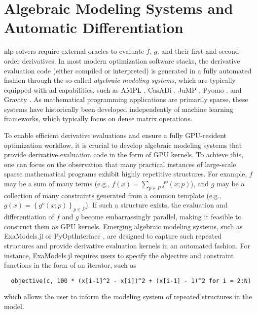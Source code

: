 \documentclass{article}
\begin{document}
\section{Algebraic Modeling Systems and Automatic Differentiation}\label{eqn:ad}
\Gls*{nlp} solvers require external oracles to evaluate $f$, $g$, and their first and second-order derivatives. In most modern optimization software stacks, the derivative evaluation code (either compiled or interpreted) is generated in a fully automated fashion through the so-called \emph{algebraic modeling systems}, which are typically equipped with \gls*{ad} capabilities, such as AMPL \cite{fourerModelingLanguageMathematical1990}, CasADi \cite{anderssonCasADiSoftwareFramework2019}, JuMP \cite{dunningJuMPModelingLanguage2017}, Pyomo \cite{hartPyomoModelingSolving2011}, and Gravity \cite{hijaziGravityMathematicalModeling2018}. As mathematical programming applications are primarily sparse, these systems have historically been developed independently of machine learning frameworks, which typically focus on dense matrix operations.

To enable efficient derivative evaluations and ensure a fully GPU-resident optimization workflow, it is crucial to develop algebraic modeling systems that provide derivative evaluation code in the form of GPU kernels. To achieve this, one can focus on the observation that many practical instances of large-scale sparse mathematical programs exhibit highly repetitive structures. For example, $f$ may be a sum of many terms (e.g., $f(x) = \sum_{p\in P} f^o(x; p)$), and $g$ may be a collection of many constraints generated from a common template (e.g., $g(x) = \left\{g^o(x; p)\right\}_{p\in P}$). If such a structure exists, the evaluation and differentiation of $f$ and $g$ become embarrassingly parallel, making it feasible to construct them as GPU kernels. Emerging algebraic modeling systems, such as ExaModels.jl \cite{shinAcceleratingOptimalPower2024} or PyOptInterface \cite{yangPyOptInterfaceDesignImplementation2024}, are designed to capture such repeated structures and provide derivative evaluation kernels in an automated fashion. For instance, ExaModels.jl requires users to specify the objective and constraint functions in the form of an iterator, such as
\begin{lstlisting}
  objective(c, 100 * (x[i-1]^2 - x[i])^2 + (x[i-1] - 1)^2 for i = 2:N)
\end{lstlisting}
which allows the user to inform the modeling system of repeated structures in the model.
\end{document}
